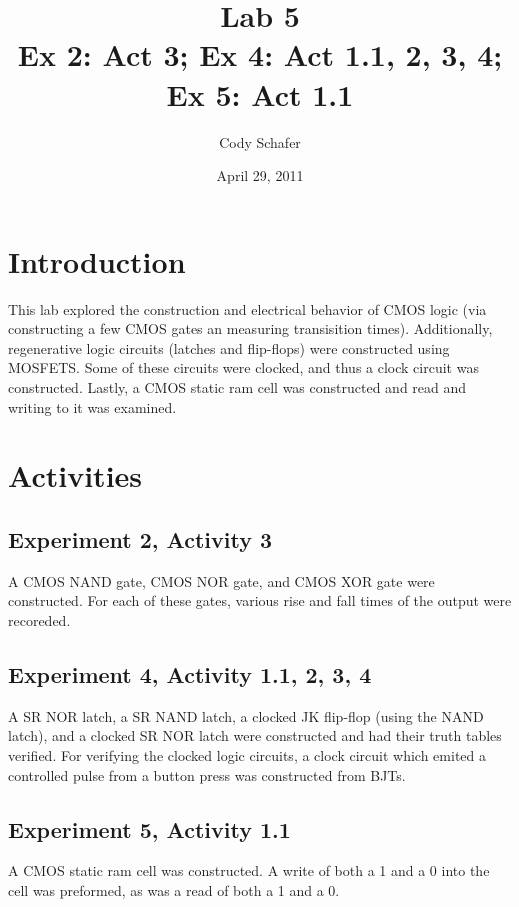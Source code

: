 \documentclass[10pt]{article}
\title{\textbf{Lab 5} \\
Ex 2: Act 3; Ex 4: Act 1.1, 2, 3, 4; Ex 5: Act 1.1}
\author{Cody Schafer}
\date{April 29, 2011}
\begin{document}
\maketitle

\section{Introduction}

This lab explored the construction and electrical behavior of CMOS logic
(via constructing a few CMOS gates an measuring transisition times).
Additionally, regenerative logic circuits (latches and flip-flops) 
were constructed using MOSFETS. Some of these circuits were clocked, and
thus a clock circuit was constructed. Lastly, a CMOS static ram cell was
constructed and read and writing to it was examined.


\section{Activities}

\subsection{Experiment 2, Activity 3}

A CMOS NAND gate, CMOS NOR gate, and CMOS XOR gate were constructed. For
each of these gates, various rise and fall times of the output were
recoreded.

\subsection{Experiment 4, Activity 1.1, 2, 3, 4}

A SR NOR latch, a SR NAND latch, a clocked JK flip-flop (using the NAND
latch), and a clocked SR NOR latch were constructed and had their truth
tables verified. For verifying the clocked logic circuits, a clock circuit
which emited a controlled pulse from a button press was constructed from
BJTs.

\subsection{Experiment 5, Activity 1.1}

A CMOS static ram cell was constructed. A write of both a 1 and a 0 into
the cell was preformed, as was a read of both a 1 and a 0.
\end{document}

